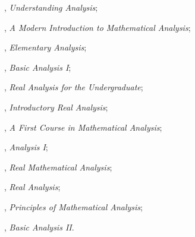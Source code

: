 \begin{remark*}

, 
\textit{Understanding Analysis};

, 
\textit{A Modern Introduction to Mathematical Analysis};

, 
\textit{Elementary Analysis};

, 
\textit{Basic Analysis I};

, 
\textit{Real Analysis for the Undergraduate};

, 
\textit{Introductory Real Analysis};

, 
\textit{A First Course in Mathematical Analysis};

, 
\textit{Analysis I};

, 
\textit{Real Mathematical Analysis};

, 
\textit{Real Analysis};

, 
\textit{Principles of Mathematical Analysis};

, 
\textit{Basic Analysis II}.

\end{remark*}
















